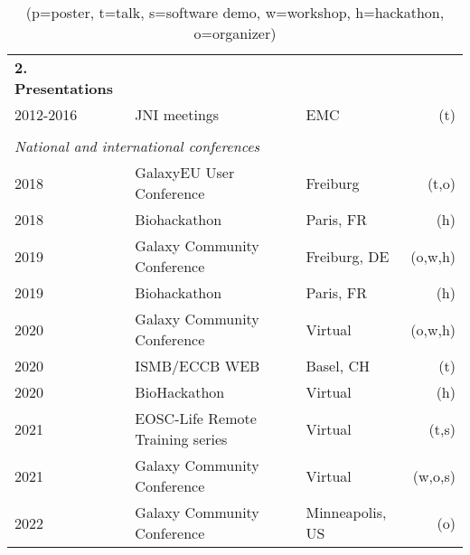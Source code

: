 \begin{table}[h!]
    \begin{tabular}{llp{0.2cm}lr}
        \textbf{2. Presentations} \\
        2012-2016 & JNI meetings                      && EMC         & (t) \\
        \\
        \multicolumn{4}{l}{\textit{National and international conferences}} \\
        2018 & GalaxyEU User Conference                    && Freiburg        & (t,o) \\
        2018 & Biohackathon                                && Paris, FR       & (h) \\
        2019 & Galaxy Community Conference                 && Freiburg, DE    & (o,w,h) \\
        2019 & Biohackathon                                && Paris, FR       & (h) \\
        2020 & Galaxy Community Conference                 && Virtual         & (o,w,h) \\
        2020 & ISMB/ECCB WEB                               && Basel, CH       & (t) \\
        2020 & BioHackathon                                && Virtual         & (h) \\
        2021 & EOSC-Life Remote Training series            && Virtual         & (t,s) \\
        2021 & Galaxy Community Conference                 && Virtual         & (w,o,s) \\
        2022 & Galaxy Community Conference                 && Minneapolis, US & (o) \\
    \end{tabular}
    \caption*{(p=poster, t=talk, s=software demo, w=workshop, h=hackathon, o=organizer)}
\end{table}


